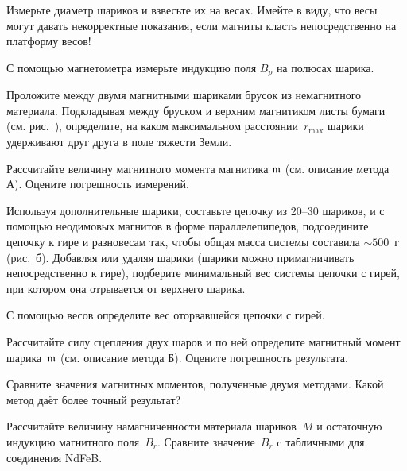 \begin{lab:task}

\taskpreamble{~}
\vspace*{-8ex} %


\item Измерьте диаметр шариков и взвесьте их на весах. Имейте в виду, 
что весы могут давать некорректные показания, 
если магниты класть непосредственно на платформу весов!

\item С помощью магнетометра измерьте индукцию поля $B_p$ на полюсах шарика. 
 
\item Проложите между двумя магнитными шариками брусок из немагнитного
материала. Подкладывая между бруском и верхним магнитиком листы бумаги 
(см. рис.~), определите, на каком максимальном 
расстоянии~$r_{\mathrm{max}}$ шарики удерживают друг друга в поле тяжести Земли. 

\item Рассчитайте величину магнитного момента магнитика $\mathfrak{m}$
(см. описание метода А). Оцените погрешность измерений.

\item Используя дополнительные шарики, составьте цепочку из 20--30 шариков, и 
с помощью неодимовых магнитов в форме параллелепипедов, подсоедините цепочку к
гире и разновесам так, чтобы общая масса системы составила $\sim500$~г 
(рис.~б). 
Добавляя или удаляя шарики (шарики можно примагничивать непосредственно к
гире), подберите минимальный вес системы цепочки с гирей, 
при котором она отрывается от верхнего шарика. 

\item С помощью весов определите вес оторвавшейся цепочки с гирей.

\item Рассчитайте силу сцепления двух шаров 
и по ней определите магнитный момент шарика~$\mathfrak{m}$ (см. описание метода Б). 
Оцените погрешность результата.

\item Сравните значения магнитных моментов, полученные двумя методами. 
Какой метод даёт более точный результат?

\item Рассчитайте величину намагниченности материала шариков~$M$
и остаточную индукцию магнитного поля~$B_r$. 
Сравните значение~$B_r$ c табличными для соединения NdFeB.


\end{lab:task}
